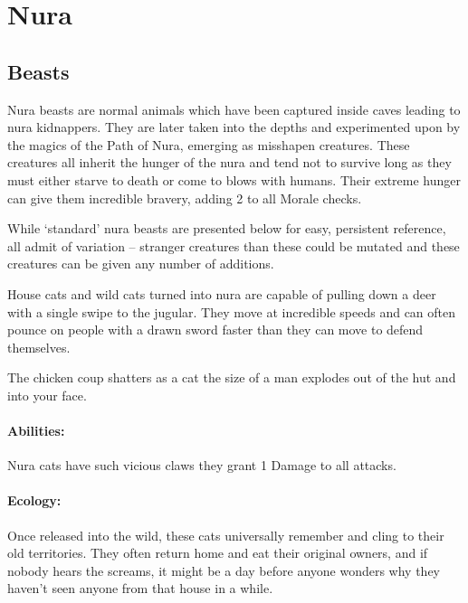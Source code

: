 \section{Nura}

\begin{multicols}{2}

\subsection{Beasts}

Nura beasts are normal animals which have been captured inside caves leading to nura kidnappers.
They are later taken into the depths and experimented upon by the magics of the Path of Nura, emerging as misshapen creatures.
These creatures all inherit the hunger of the nura and tend not to survive long as they must either starve to death or come to blows with humans.
Their extreme hunger can give them incredible bravery, adding 2 to all Morale checks.

While `standard' nura beasts are presented below for easy, persistent reference, all admit of variation -- stranger creatures than these could be mutated and these creatures can be given any number of additions.

\label{nura_cat}

House cats and wild cats turned into nura are capable of pulling down a deer with a single swipe to the jugular.
They move at incredible speeds and can often pounce on people with a drawn sword faster than they can move to defend themselves.

\begin{boxtext}

	The chicken coup shatters as a cat the size of a man explodes out of the hut and into your face.

\end{boxtext}

\paragraph{Abilities:}Nura cats have such vicious claws they grant 1 Damage to all attacks.

\paragraph{Ecology:} Once released into the wild, these cats universally remember and cling to their old territories.
They often return home and eat their original owners, and if nobody hears the screams, it might be a day before anyone wonders why they haven't seen anyone from that house in a while.


\end{multicols}
